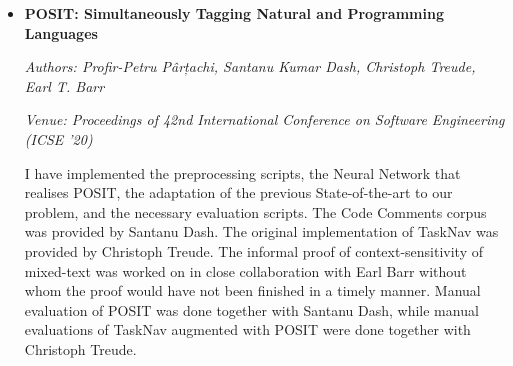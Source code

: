 \begin{conjoint}
\begin{itemize}[leftmargin=*]
    \pagebreak
    
    \item[] \noindent\textbf{POSIT: Simultaneously Tagging Natural and
    Programming Languages} 
    
    \noindent\emph{Authors: Profir-Petru Pârțachi, Santanu Kumar Dash, Christoph
    Treude, Earl T. Barr}
    
    \noindent\emph{Venue: Proceedings of 42nd International Conference on
    Software Engineering (ICSE ’20)}

    \noindent I have implemented the preprocessing scripts, the Neural Network
    that realises POSIT, the adaptation of the previous State-of-the-art to our
    problem, and the necessary evaluation scripts. The Code Comments corpus was
    provided by Santanu Dash. The original implementation of TaskNav was
    provided by Christoph Treude. The informal proof of context-sensitivity of
    mixed-text was worked on in close collaboration with Earl Barr without whom
    the proof would have not been finished in a timely manner. Manual evaluation
    of POSIT was done together with Santanu Dash, while manual evaluations of
    TaskNav augmented with POSIT were done together with Christoph Treude.

\end{itemize}


\end{conjoint}

